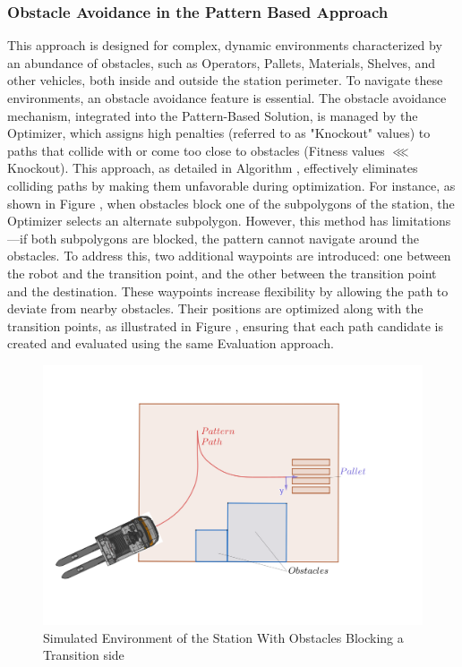 \subsubsection{Obstacle Avoidance in the Pattern Based Approach}
This approach is designed for complex, dynamic environments characterized by an abundance of obstacles, such 
as Operators, Pallets, Materials, Shelves, and other vehicles, both inside and outside the station perimeter. 
To navigate these environments, an obstacle avoidance feature is essential. The obstacle avoidance mechanism, 
integrated into the Pattern-Based Solution, is managed by the Optimizer, which assigns high penalties 
(referred to as "Knockout" values) to paths that collide with or come too close to obstacles 
(Fitness values $\lll$ Knockout). This approach, as detailed in Algorithm , 
effectively eliminates colliding paths by making them unfavorable during optimization. For instance, 
as shown in Figure , when obstacles block one of the subpolygons of the station, the 
Optimizer selects an alternate subpolygon. However, this method has limitations—if both subpolygons 
are blocked, the pattern cannot navigate around the obstacles. To address this, two additional 
waypoints are introduced: one between the robot and the transition point, and the other between 
the transition point and the destination. These waypoints increase flexibility by allowing the path 
to deviate from nearby obstacles. Their positions are optimized along with the transition points, as 
illustrated in Figure , ensuring that each path candidate is created and evaluated 
using the same Evaluation approach.


\begin{figure}[H]
    \begin{center}
        \includegraphics[width=5in]{images/Chap2/Obstacles_In_Station.png} %
        \caption{Simulated Environment of the Station With Obstacles Blocking a Transition side}
        \label{Obstacle}
        \end{center}    
\end{figure}


